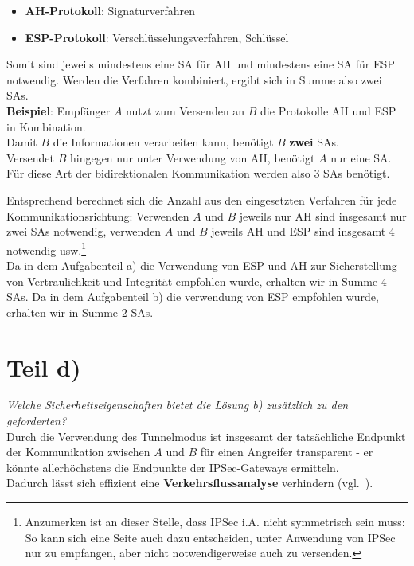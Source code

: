 \begin{itemize}
    \item \textbf{AH-Protokoll}: Signaturverfahren
    \item \textbf{ESP-Protokoll}: Verschlüsselungsverfahren, Schlüssel
\end{itemize}

\noindent
Somit sind jeweils mindestens eine SA für AH und mindestens eine SA für ESP notwendig.
Werden die Verfahren kombiniert, ergibt sich in Summe also zwei SAs.\\

\noindent
\textbf{Beispiel}:
Empfänger $A$ nutzt zum Versenden an $B$ die Protokolle AH und ESP in Kombination.\\
Damit $B$ die Informationen verarbeiten kann, benötigt $B$ \textbf{zwei} SAs.\\
Versendet $B$ hingegen nur unter Verwendung von AH, benötigt $A$ nur eine SA.
Für diese Art der bidirektionalen Kommunikation werden also 3 SAs benötigt.

\noindent
Entsprechend berechnet sich die Anzahl aus den eingesetzten Verfahren für jede Kommunikationsrichtung: Verwenden $A$ und $B$ jeweils nur AH sind insgesamt nur zwei SAs notwendig, verwenden $A$ und $B$ jeweils AH und ESP sind insgesamt 4 notwendig usw.\footnote{
    Anzumerken ist an dieser Stelle, dass IPSec i.A. nicht symmetrisch sein muss: So kann sich eine Seite auch dazu entscheiden, unter Anwendung von IPSec nur zu empfangen, aber nicht notwendigerweise auch zu versenden.
}\\

\noindent
Da in dem Aufgabenteil a) die  Verwendung von ESP und AH zur Sicherstellung von Vertraulichkeit und Integrität empfohlen wurde, erhalten wir in Summe $4$ SAs.
Da in dem Aufgabenteil b) die verwendung von ESP empfohlen wurde, erhalten wir in Summe $2$ SAs.\\


\section{Teil d)}

\textit{Welche Sicherheitseigenschaften bietet die Lösung b) zusätzlich zu den geforderten?}\\

\noindent
Durch die Verwendung des Tunnelmodus ist insgesamt der tatsächliche Endpunkt der Kommunikation zwischen $A$ und $B$ für einen Angreifer transparent - er könnte allerhöchstens die Endpunkte der IPSec-Gateways ermitteln.\\
Dadurch lässt sich effizient eine \textbf{Verkehrsflussanalyse} verhindern (vgl.~\cite[46]{ITS4}).